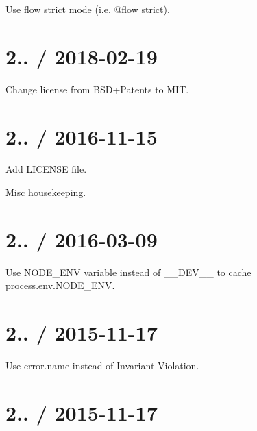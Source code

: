 
\begin{DoxyItemize}
\item Use flow strict mode (i.\+e. {\ttfamily @flow strict}).
\end{DoxyItemize}

\section*{2.. / 2018-\/02-\/19 }


\begin{DoxyItemize}
\item Change license from B\+S\+D+\+Patents to M\+IT.
\end{DoxyItemize}

\section*{2.. / 2016-\/11-\/15 }


\begin{DoxyItemize}
\item Add L\+I\+C\+E\+N\+SE file.
\item Misc housekeeping.
\end{DoxyItemize}

\section*{2.. / 2016-\/03-\/09 }


\begin{DoxyItemize}
\item Use {\ttfamily N\+O\+D\+E\+\_\+\+E\+NV} variable instead of {\ttfamily \+\_\+\+\_\+\+D\+E\+V\+\_\+\+\_\+} to cache {\ttfamily process.\+env.\+N\+O\+D\+E\+\_\+\+E\+NV}.
\end{DoxyItemize}

\section*{2.. / 2015-\/11-\/17 }


\begin{DoxyItemize}
\item Use {\ttfamily error.\+name} instead of {\ttfamily Invariant Violation}.
\end{DoxyItemize}

\section*{2.. / 2015-\/11-\/17 }


